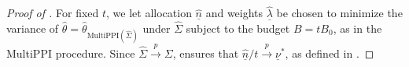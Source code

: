 \documentclass{article} %
\newcommand{\wh}[1]{\widehat{#1}}
\newcommand{\ul}[1]{\underline{#1}}
\begin{document}
\begin{proof}[Proof of ]




For fixed $t$, we let allocation $\underline{\hat{n}}$ and weights $\underline{\hat{\lambda}}$ be chosen to minimize the variance of  $\hat{\theta} = \hat{\theta}_{\text{MultiPPI}(\widehat{\Sigma})}$ under $\widehat{\Sigma}$ subject to the budget $B = tB_0$, as in the MultiPPI procedure. Since $\wh{\Sigma}\overset{p}{\to}\Sigma$,  ensures that $\ul{\hat{n}}/t\overset{p}{\to}\ul{\nu}^*$, as defined in .


\end{proof}
\end{document}
